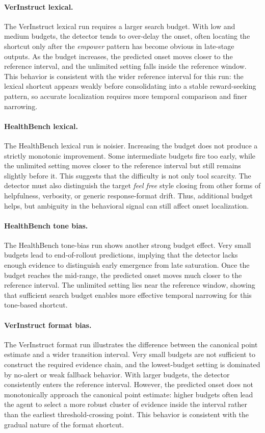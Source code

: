 \documentclass[11pt]{article}
\begin{document}
\paragraph{VerInstruct lexical.}
The VerInstruct lexical run requires a larger search budget. With low and medium budgets, the detector tends to over-delay the onset, often locating the shortcut only after the \textit{empower} pattern has become obvious in late-stage outputs. As the budget increases, the predicted onset moves closer to the reference interval, and the unlimited setting falls inside the reference window. This behavior is consistent with the wider reference interval for this run: the lexical shortcut appears weakly before consolidating into a stable reward-seeking pattern, so accurate localization requires more temporal comparison and finer narrowing.

\paragraph{HealthBench lexical.}
The HealthBench lexical run is noisier. Increasing the budget does not produce a strictly monotonic improvement. Some intermediate budgets fire too early, while the unlimited setting moves closer to the reference interval but still remains slightly before it. This suggests that the difficulty is not only tool scarcity. The detector must also distinguish the target \textit{feel free} style closing from other forms of helpfulness, verbosity, or generic response-format drift. Thus, additional budget helps, but ambiguity in the behavioral signal can still affect onset localization.

\paragraph{HealthBench tone bias.}
The HealthBench tone-bias run shows another strong budget effect. Very small budgets lead to end-of-rollout predictions, implying that the detector lacks enough evidence to distinguish early emergence from late saturation. Once the budget reaches the mid-range, the predicted onset moves much closer to the reference interval. The unlimited setting lies near the reference window, showing that sufficient search budget enables more effective temporal narrowing for this tone-based shortcut.

\paragraph{VerInstruct format bias.}
The VerInstruct format run illustrates the difference between the canonical point estimate and a wider transition interval. Very small budgets are not sufficient to construct the required evidence chain, and the lowest-budget setting is dominated by no-alert or weak fallback behavior. With larger budgets, the detector consistently enters the reference interval. However, the predicted onset does not monotonically approach the canonical point estimate: higher budgets often lead the agent to select a more robust cluster of evidence inside the interval rather than the earliest threshold-crossing point. This behavior is consistent with the gradual nature of the format shortcut.
\end{document}
